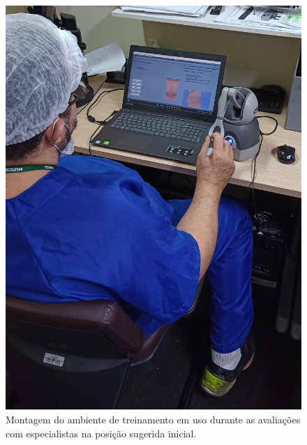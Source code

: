 \begin{figure}[ht!]
    \centering
    \includegraphics[width=0.4\linewidth]{capitulos/figuras/montagem-teste-especialistas-1.jpg} 
    \caption{Montagem do ambiente de treinamento em uso durante as avaliações com especialistas na posição sugerida inicial.}
    \label{fig:montagemTesteEspecialistasInicial}
\end{figure}


